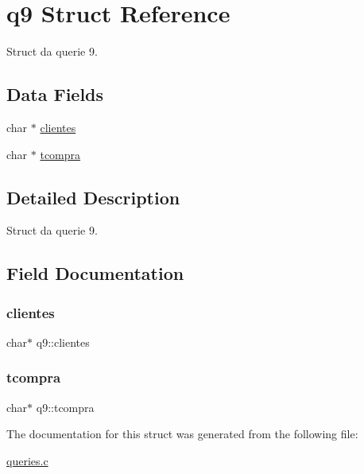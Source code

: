 \hypertarget{structq9}{}\section{q9 Struct Reference}
\label{structq9}


Struct da querie 9.  


\subsection*{Data Fields}
\begin{DoxyCompactItemize}
\item 
char $\ast$ \mbox{\hyperlink{structq9_ad352297115864abd06b43054801c7a22}{clientes}}
\item 
char $\ast$ \mbox{\hyperlink{structq9_a89f82d8312cee5426a0c9a9c717a469a}{tcompra}}
\end{DoxyCompactItemize}


\subsection{Detailed Description}
Struct da querie 9. 



\subsection{Field Documentation}
\mbox{\label{structq9_ad352297115864abd06b43054801c7a22}} 
\subsubsection{\texorpdfstring{clientes}{clientes}}
{\footnotesize\ttfamily char$\ast$ q9\+::clientes}

\mbox{\label{structq9_a89f82d8312cee5426a0c9a9c717a469a}} 
\subsubsection{\texorpdfstring{tcompra}{tcompra}}
{\footnotesize\ttfamily char$\ast$ q9\+::tcompra}



The documentation for this struct was generated from the following file\+:\begin{DoxyCompactItemize}
\item 
\mbox{\hyperlink{queries_8c}{queries.\+c}}\end{DoxyCompactItemize}

